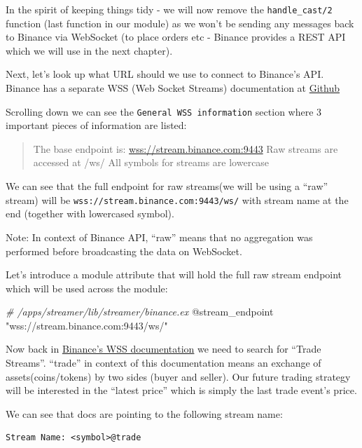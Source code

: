 \documentclass[
]{book}
\newenvironment{Shaded}{\begin{snugshade}}{\end{snugshade}}
\newcommand{\CommentTok}[1]{\textcolor[rgb]{0.56,0.35,0.01}{\textit{#1}}}
\newcommand{\OtherTok}[1]{\textcolor[rgb]{0.56,0.35,0.01}{#1}}
\newcommand{\StringTok}[1]{\textcolor[rgb]{0.31,0.60,0.02}{#1}}
\begin{document}
In the spirit of keeping things tidy - we will now remove the \texttt{handle\_cast/2} function (last function in our module) as we won't be sending any messages back to Binance via WebSocket (to place orders etc - Binance provides a REST API which we will use in the next chapter).

Next, let's look up what URL should we use to connect to Binance's API. Binance has a separate WSS (Web Socket Streams) documentation at \href{https://github.com/binance/binance-spot-api-docs/blob/master/web-socket-streams.md}{Github}

Scrolling down we can see the \texttt{General\ WSS\ information} section where 3 important pieces of information are listed:

\begin{quote}
The base endpoint is: \url{wss://stream.binance.com:9443}
Raw streams are accessed at /ws/
All symbols for streams are lowercase
\end{quote}

We can see that the full endpoint for raw streams(we will be using a ``raw'' stream) will be \texttt{wss://stream.binance.com:9443/ws/} with stream name at the end (together with lowercased symbol).

Note: In context of Binance API, ``raw'' means that no aggregation was performed before broadcasting the data on WebSocket.

Let's introduce a module attribute that will hold the full raw stream endpoint which will be used across the module:

\begin{Shaded}
\begin{Highlighting}[]
\CommentTok{\# /apps/streamer/lib/streamer/binance.ex}
\OtherTok{@stream\_endpoint} \StringTok{"wss://stream.binance.com:9443/ws/"}
\end{Highlighting}
\end{Shaded}

Now back in \href{https://github.com/binance/binance-spot-api-docs/blob/master/web-socket-streams.md}{Binance's WSS documentation} we need to search for ``Trade Streams''. ``trade'' in context of this documentation means an exchange of assets(coins/tokens) by two sides (buyer and seller). Our future trading strategy will be interested in the ``latest price'' which is simply the last trade event's price.

We can see that docs are pointing to the following stream name:

\begin{verbatim}
Stream Name: <symbol>@trade
\end{verbatim}
\end{document}
